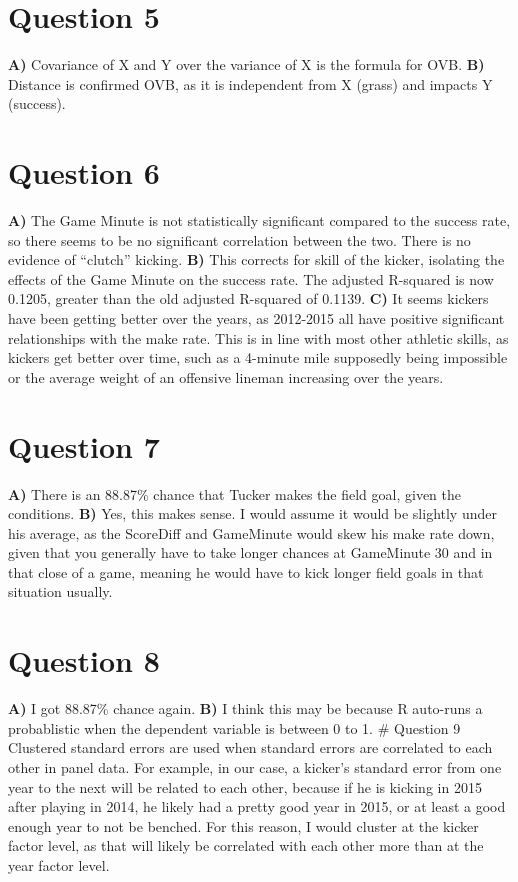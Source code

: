 \documentclass[]{article}
\begin{document}
\section{Question 5}\label{question-5}

\textbf{A)} Covariance of X and Y over the variance of X is the formula
for OVB. \textbf{B)} Distance is confirmed OVB, as it is independent
from X (grass) and impacts Y (success).

\section{Question 6}\label{question-6}

\textbf{A)} The Game Minute is not statistically significant compared to
the success rate, so there seems to be no significant correlation
between the two. There is no evidence of ``clutch'' kicking. \textbf{B)}
This corrects for skill of the kicker, isolating the effects of the Game
Minute on the success rate. The adjusted R-squared is now 0.1205,
greater than the old adjusted R-squared of 0.1139. \textbf{C)} It seems
kickers have been getting better over the years, as 2012-2015 all have
positive significant relationships with the make rate. This is in line
with most other athletic skills, as kickers get better over time, such
as a 4-minute mile supposedly being impossible or the average weight of
an offensive lineman increasing over the years.

\section{Question 7}\label{question-7}

\textbf{A)} There is an 88.87\% chance that Tucker makes the field goal,
given the conditions. \textbf{B)} Yes, this makes sense. I would assume
it would be slightly under his average, as the ScoreDiff and GameMinute
would skew his make rate down, given that you generally have to take
longer chances at GameMinute 30 and in that close of a game, meaning he
would have to kick longer field goals in that situation usually.

\section{Question 8}\label{question-8}

\textbf{A)} I got 88.87\% chance again. \textbf{B)} I think this may be
because R auto-runs a probablistic when the dependent variable is
between 0 to 1. \# Question 9 Clustered standard errors are used when
standard errors are correlated to each other in panel data. For example,
in our case, a kicker's standard error from one year to the next will be
related to each other, because if he is kicking in 2015 after playing in
2014, he likely had a pretty good year in 2015, or at least a good
enough year to not be benched. For this reason, I would cluster at the
kicker factor level, as that will likely be correlated with each other
more than at the year factor level.
\end{document}
